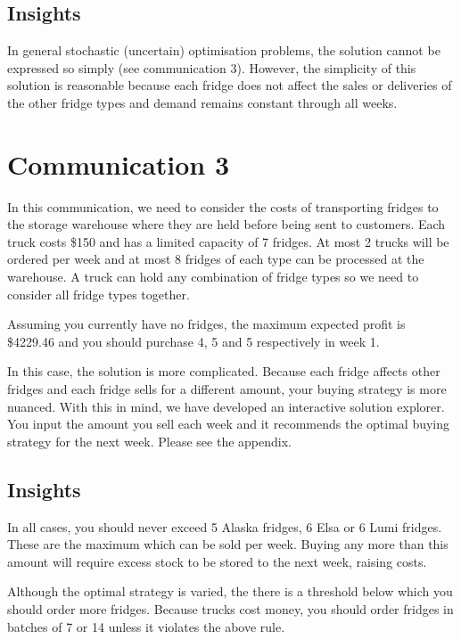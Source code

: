 \documentclass[11pt,a4paper]{article}
\begin{document}
\subsection{Insights}
In general stochastic (uncertain)
optimisation problems, the solution cannot be expressed so simply (see communication 3).
However, the simplicity of this solution is reasonable because
each fridge does not affect the sales or deliveries of the other fridge types
and demand remains constant through all weeks.

\section{Communication 3}
In this communication, we need to consider the costs of transporting fridges to 
the storage warehouse where they are held before being sent to customers. 
Each truck costs \$150 and has a  limited capacity of 7 fridges. At most 2 trucks 
will be ordered per week and at most 8 fridges of each type can be processed 
at the warehouse. A truck can hold any combination of fridge types so we need 
to consider all fridge types together.

Assuming you currently have no fridges, the maximum expected profit is 
\$4229.46 and you should purchase 4, 5 and 5 respectively in week 1. 

In this case, the solution is more complicated. Because each fridge affects 
other fridges and each fridge sells for a different amount, your buying strategy 
is more nuanced. With this in mind, we have developed an interactive 
solution explorer. You input the amount you sell each week and it recommends 
the optimal buying strategy for the next week. Please see the appendix.

\subsection{Insights}
In all cases, you should never exceed 5 Alaska fridges, 6 Elsa or 6 Lumi fridges.
These are the maximum which can be sold per week. Buying any more than this amount 
will require excess stock to be stored to the next week, raising costs. 

Although the optimal strategy is varied, the there is a threshold below which you 
should order more fridges. Because trucks cost money, you should order 
fridges in batches of 7 or 14 unless it violates the above rule.
\end{document}
